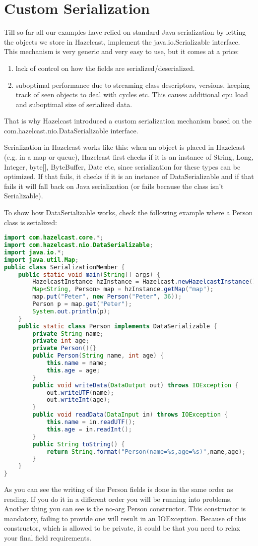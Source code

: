 \chapter{Custom Serialization}
Till so far all our examples have relied on standard Java serialization by letting the objects we store in Hazelcast, implement the java.io.Serializable interface. This mechanism is very generic and very easy to use, but it comes at a price:
\begin{enumerate}
\item lack of control on how the fields are serialized/deserialized.
\item suboptimal performance due to streaming class descriptors, versions, keeping track of seen objects to deal with cycles etc. This causes additional cpu load and suboptimal size of serialized data.
\end{enumerate}
That is why Hazelcast introduced a custom serialization mechanism based on the com.hazelcast.nio.DataSerializable interface. 

Serialization in Hazelcast works like this: when an object is placed in Hazelcast (e.g. in a map or queue), Hazelcast first checks if it is an instance of String, Long, Integer, byte[], ByteBuffer, Date etc, since serialization for these types can be optimized. If that fails, it checks if it is an instance of DataSerializable and if that fails it will fall back on Java serialization (or fails because the class isn't Serializable). 

To show how DataSerializable works, check the following example where a Person class is serialized:
\begin{lstlisting}[language=java]
import com.hazelcast.core.*;
import com.hazelcast.nio.DataSerializable;
import java.io.*;
import java.util.Map;
public class SerializationMember {
    public static void main(String[] args) {
        HazelcastInstance hzInstance = Hazelcast.newHazelcastInstance();
        Map<String, Person> map = hzInstance.getMap("map");
        map.put("Peter", new Person("Peter", 36));
        Person p = map.get("Peter");
        System.out.println(p);
    }
    public static class Person implements DataSerializable {
        private String name;
        private int age;
        private Person(){}
        public Person(String name, int age) {
            this.name = name;
            this.age = age;
        }
        public void writeData(DataOutput out) throws IOException {
            out.writeUTF(name);
            out.writeInt(age);
        }
        public void readData(DataInput in) throws IOException {
            this.name = in.readUTF();
            this.age = in.readInt();
        }
        public String toString() {
            return String.format("Person(name=%s,age=%s)",name,age);
        }
    }
}
\end{lstlisting}
As you can see the writing of the Person fields is done in the same order as reading. If you do it in a different order you will be running into problems. Another thing you can see is the no-arg Person constructor. This constructor is mandatory, failing to provide one will result in an IOException. Because of this constructor, which is allowed to be private, it could be that you need to relax your final field requirements.

